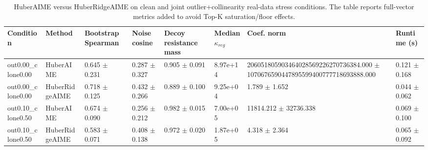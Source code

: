 \begin{table}[t]
\centering
\begin{tabular}{llllllll}
\toprule
Condition & Method & Bootstrap Spearman & Noise cosine & Decoy resistance mass & Median $\kappa_{reg}$ & Coef. norm & Runtime (s) \\
\midrule
out0.00_clone0.00 & HuberAIME & 0.645 $\pm$ 0.231 & 0.287 $\pm$ 0.327 & 0.905 $\pm$ 0.091 & 8.97e+14 & 206051805903464028569226270736384.000 $\pm$ 1070676590447895599400777718693888.000 & 0.121 $\pm$ 0.168 \\
out0.00_clone0.00 & HuberRidgeAIME & 0.718 $\pm$ 0.125 & 0.432 $\pm$ 0.266 & 0.889 $\pm$ 0.100 & 9.25e+04 & 1.789 $\pm$ 1.652 & 0.044 $\pm$ 0.062 \\
out0.10_clone0.50 & HuberAIME & 0.674 $\pm$ 0.090 & 0.256 $\pm$ 0.212 & 0.982 $\pm$ 0.015 & 7.00e+05 & 11814.212 $\pm$ 32736.338 & 0.069 $\pm$ 0.100 \\
out0.10_clone0.50 & HuberRidgeAIME & 0.583 $\pm$ 0.071 & 0.408 $\pm$ 0.138 & 0.972 $\pm$ 0.020 & 1.87e+05 & 4.318 $\pm$ 2.364 & 0.065 $\pm$ 0.092 \\
\bottomrule
\end{tabular}

\caption{HuberAIME versus HuberRidgeAIME on clean and joint outlier+collinearity real-data stress conditions. The table reports full-vector metrics added to avoid Top-K saturation/floor effects.}
\label{tab:revision_hra_huberaime_pathology}
\end{table}